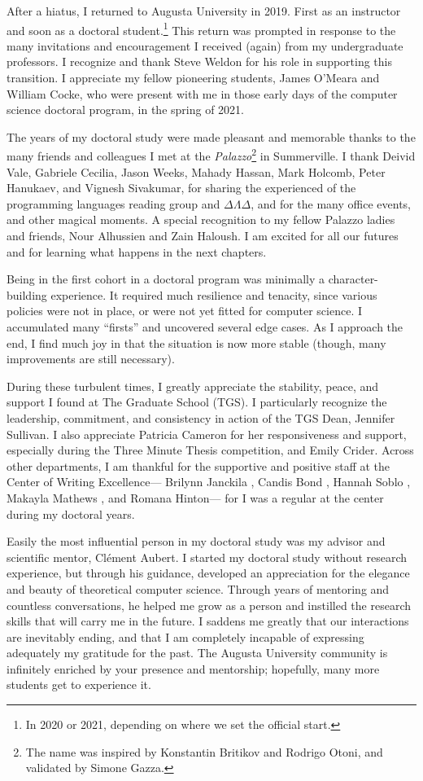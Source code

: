 After a hiatus, I returned to Augusta University in 2019.
First as an instructor and soon as a doctoral student.\footnote{In 2020 or 2021, depending on where we set the official start.}
This return was prompted in response to the many invitations and encouragement I received (again) from my undergraduate professors.
I recognize and thank Steve Weldon for his role in supporting this transition.
I appreciate my fellow pioneering students, James O'Meara and William Cocke, who were present with me in those early days of the computer science doctoral program, in the spring of 2021.

The years of my doctoral study were made pleasant and memorable thanks to the many friends and colleagues I met at the \emph{Palazzo}\footnote{The name was inspired by Konstantin Britikov and Rodrigo Otoni, and validated by Simone Gazza.} in Summerville.
I thank Deivid Vale, Gabriele Cecilia, Jason Weeks, Mahady Hassan, Mark Holcomb, Peter Hanukaev, and Vignesh Sivakumar, for sharing the experienced of the programming languages reading group and $\Delta\Lambda\Delta$, and for the many office events, and other magical moments.
A special recognition to my fellow Palazzo ladies and friends, Nour Alhussien and Zain Haloush.
I am excited for all our futures and for learning what happens in the next chapters.

Being in the first cohort in a doctoral program was minimally a character-building experience.
It required much resilience and tenacity, since various policies were not in place, or were not yet fitted for computer science.
I accumulated many \enquote{firsts} and uncovered several edge cases.
As I approach the end, I find much joy in that the situation is now more stable (though, many improvements are still necessary).

During these turbulent times, I greatly appreciate the stability, peace, and support I found at The Graduate School (TGS).
I particularly recognize the leadership, commitment, and consistency in action of the TGS Dean, Jennifer Sullivan.
I also appreciate Patricia Cameron for her responsiveness and support, especially during the Three Minute Thesis competition, and Emily Crider.
Across other departments, I am thankful for the supportive and positive staff at the Center of Writing Excellence---%
Brilynn Janckila%
, Candis Bond%
, Hannah Soblo%
, Makayla Mathews%
, and Romana Hinton---%
for I was a regular at the center during my doctoral years.

Easily the most influential person in my doctoral study was my advisor and scientific mentor, Clément Aubert.
I started my doctoral study without research experience, but  through his guidance, developed an appreciation for the elegance and beauty of theoretical computer science.
Through years of mentoring and countless conversations, he helped me grow as a person and instilled the research skills that will carry me in the future.
I saddens me greatly that our interactions are inevitably ending, and that I am completely incapable of expressing adequately my gratitude for the past.
The Augusta University community is infinitely enriched by your presence and mentorship;
hopefully, many more students get to experience it.

